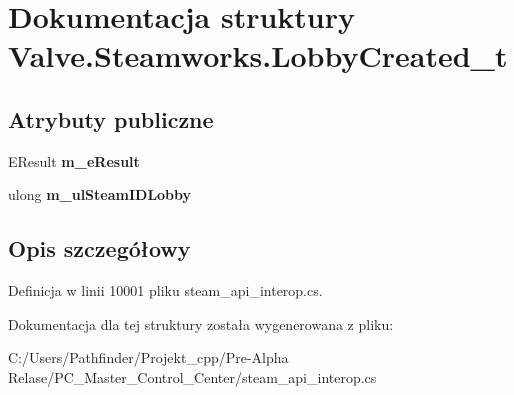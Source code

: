 \hypertarget{struct_valve_1_1_steamworks_1_1_lobby_created__t}{}\section{Dokumentacja struktury Valve.\+Steamworks.\+Lobby\+Created\+\_\+t}
\label{struct_valve_1_1_steamworks_1_1_lobby_created__t}
\subsection*{Atrybuty publiczne}
\begin{DoxyCompactItemize}
\item 
\mbox{\label{struct_valve_1_1_steamworks_1_1_lobby_created__t_a61cd7d6b0a9fc69a263a5a5dcee4268e}} 
E\+Result {\bfseries m\+\_\+e\+Result}
\item 
\mbox{\label{struct_valve_1_1_steamworks_1_1_lobby_created__t_a7f0ffbf3f04557ddf43c22668ea047b1}} 
ulong {\bfseries m\+\_\+ul\+Steam\+I\+D\+Lobby}
\end{DoxyCompactItemize}


\subsection{Opis szczegółowy}


Definicja w linii 10001 pliku steam\+\_\+api\+\_\+interop.\+cs.



Dokumentacja dla tej struktury została wygenerowana z pliku\+:\begin{DoxyCompactItemize}
\item 
C\+:/\+Users/\+Pathfinder/\+Projekt\+\_\+cpp/\+Pre-\/\+Alpha Relase/\+P\+C\+\_\+\+Master\+\_\+\+Control\+\_\+\+Center/steam\+\_\+api\+\_\+interop.\+cs\end{DoxyCompactItemize}
